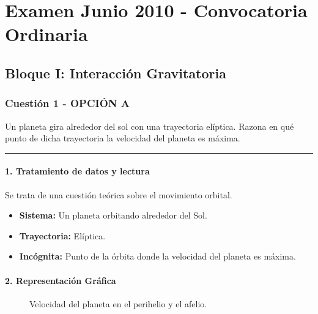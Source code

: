 \chapter{Examen Junio 2010 - Convocatoria Ordinaria}
\label{chap:2010_jun_ord}

\section{Bloque I: Interacción Gravitatoria}
\label{sec:grav_2010_jun_ord}

\subsection{Cuestión 1 - OPCIÓN A}
\label{subsec:1A_2010_jun_ord}
\begin{cajaenunciado}
Un planeta gira alrededor del sol con una trayectoria elíptica. Razona en qué punto de dicha trayectoria la velocidad del planeta es máxima.
\end{cajaenunciado}
\hrule

\subsubsection*{1. Tratamiento de datos y lectura}
Se trata de una cuestión teórica sobre el movimiento orbital.
\begin{itemize}
    \item \textbf{Sistema:} Un planeta orbitando alrededor del Sol.
    \item \textbf{Trayectoria:} Elíptica.
    \item \textbf{Incógnita:} Punto de la órbita donde la velocidad del planeta es máxima.
\end{itemize}

\subsubsection*{2. Representación Gráfica}
\begin{figure}[H]
    \centering
    \caption{Velocidad del planeta en el perihelio y el afelio.}
\end{figure}

